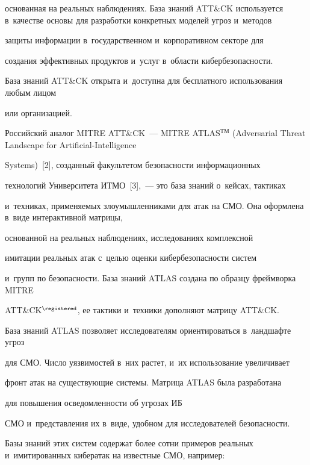 основанная на реальных наблюдениях. База знаний ATT\&CK используется в~качестве основы для разработки конкретных моделей угроз и~методов 

защиты информации в~государственном и~корпоративном секторе для 

создания эффективных продуктов и~услуг в~области ки\-бер\-безопас\-ности. 

База знаний ATT\&CK открыта и~доступна для бесплатного использования любым лицом 

или организацией.

     

     Российский аналог MITRE ATT\&CK~--- MITRE ATLAS$^{\mathrm{ТМ}}$ (Adversarial Threat Landscape for Artificial-Intelligence 

Systems)~[2], созданный факультетом безопас\-ности информационных 

технологий Университета ИТМО~[3],~--- это база знаний о~кейсах, тактиках 

и~техниках, применяемых злоумышленниками для атак на СМО. Она оформлена в~виде интерактивной матрицы, 

основанной на реальных наблюдениях, исследованиях комплексной 

имитации реальных атак с~целью оценки ки\-бер\-безопас\-ности сис\-тем 

и~групп по безопас\-ности. База знаний ATLAS создана по образцу фреймворка MITRE 

ATT\&CK$^\registered$, ее тактики и~техники дополняют матрицу ATT\&CK.

     

     База знаний ATLAS позволяет исследователям ориентироваться в~ландшафте угроз 

для СМО. Число уязвимостей в~них растет, и~их использование увеличивает 

фронт атак на существующие сис\-те\-мы. Матрица ATLAS была разработана 

для повышения осведомленности об угрозах ИБ 

СМО и~пред\-став\-ле\-ния их в~виде, удобном для исследователей безопас\-ности.


     Базы знаний этих систем содержат более сотни примеров реальных и~имитированных кибератак на известные СМО, например: 

